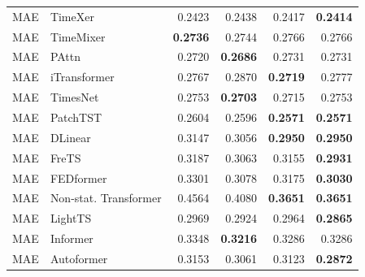 \begin{longtable}{llrrrr}
\midrule
MAE & TimeXer & 0.2423 & 0.2438 & 0.2417 & \textbf{0.2414} \\
MAE & TimeMixer & \textbf{0.2736} & 0.2744 & 0.2766 & 0.2766 \\
MAE & PAttn & 0.2720 & \textbf{0.2686} & 0.2731 & 0.2731 \\
MAE & iTransformer & 0.2767 & 0.2870 & \textbf{0.2719} & 0.2777 \\
MAE & TimesNet & 0.2753 & \textbf{0.2703} & 0.2715 & 0.2753 \\
MAE & PatchTST & 0.2604 & 0.2596 & \textbf{0.2571} & \textbf{0.2571} \\
MAE & DLinear & 0.3147 & 0.3056 & \textbf{0.2950} & \textbf{0.2950} \\
MAE & FreTS & 0.3187 & 0.3063 & 0.3155 & \textbf{0.2931} \\
MAE & FEDformer & 0.3301 & 0.3078 & 0.3175 & \textbf{0.3030} \\
MAE & Non-stat. Transformer & 0.4564 & 0.4080 & \textbf{0.3651} & \textbf{0.3651} \\
MAE & LightTS & 0.2969 & 0.2924 & 0.2964 & \textbf{0.2865} \\
MAE & Informer & 0.3348 & \textbf{0.3216} & 0.3286 & 0.3286 \\
MAE & Autoformer & 0.3153 & 0.3061 & 0.3123 & \textbf{0.2872} \\
\end{longtable}
\endgroup

